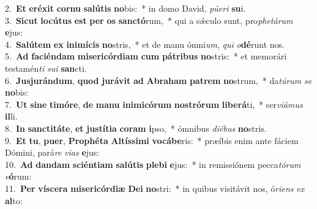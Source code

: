{2.~}\textbf{Et} \textbf{e}\textbf{ré}\textbf{xit} \textbf{cor}\textbf{nu} \textbf{sa}\textbf{lú}\textbf{tis} \textbf{no}bis:~* in domo David, \textit{pú}\textit{e}\textit{ri} \textbf{su}i.\\
{3.~}\textbf{Si}\textbf{cut} \textbf{lo}\textbf{cú}\textbf{tus} \textbf{est} \textbf{per} \textbf{os} \textbf{san}\textbf{ctó}rum,~* qui a sǽculo sunt, pro\textit{phe}\textit{tá}\textit{rum} \textbf{e}jus:\\
{4.~}\textbf{Sa}\textbf{lú}\textbf{tem} \textbf{ex} \textbf{i}\textbf{ni}\textbf{mí}\textbf{cis} \textbf{no}stris,~* et de manu ómni\textit{um}, \textit{qui} \textit{o}\textbf{dé}runt nos.\\
{5.~}\textbf{Ad} \textbf{fa}\textbf{ci}\textbf{én}\textbf{dam} \textbf{mi}\textbf{se}\textbf{ri}\textbf{cór}\textbf{di}\textbf{am} \textbf{cum} \textbf{pá}\textbf{tri}\textbf{bus} \textbf{no}stris:~* et memorári testamén\textit{ti} \textit{su}\textit{i} \textbf{san}cti.\\
{6.~}\textbf{Jus}\textbf{ju}\textbf{rán}\textbf{dum}, \textbf{quod} \textbf{ju}\textbf{rá}\textbf{vit} \textbf{ad} \textbf{A}\textbf{bra}\textbf{ham} \textbf{pa}\textbf{trem} \textbf{no}strum,~* da\textit{tú}\textit{rum} \textit{se} \textbf{no}bis:\\
{7.~}\textbf{Ut} \textbf{si}\textbf{ne} \textbf{ti}\textbf{mó}\textbf{re}, \textbf{de} \textbf{ma}\textbf{nu} \textbf{i}\textbf{ni}\textbf{mi}\textbf{có}\textbf{rum} \textbf{no}\textbf{stró}\textbf{rum} \textbf{li}\textbf{be}\textbf{rá}ti,~* ser\textit{vi}\textit{á}\textit{mus} \textbf{il}li.\\
{8.~}\textbf{In} \textbf{san}\textbf{cti}\textbf{tá}\textbf{te}, \textbf{et} \textbf{ju}\textbf{stí}\textbf{ti}\textbf{a} \textbf{co}\textbf{ram} \textbf{i}pso,~* ómnibus \textit{di}\textit{é}\textit{bus} \textbf{no}stris.\\
{9.~}\textbf{Et} \textbf{tu}, \textbf{pu}\textbf{er}, \textbf{Pro}\textbf{phé}\textbf{ta} \textbf{Al}\textbf{tís}\textbf{si}\textbf{mi} \textbf{vo}\textbf{cá}\textbf{be}ris:~* præíbis enim ante fáciem Dómini, pará\textit{re} \textit{vi}\textit{as} \textbf{e}jus:\\
{10.~}\textbf{Ad} \textbf{dan}\textbf{dam} \textbf{sci}\textbf{én}\textbf{ti}\textbf{am} \textbf{sa}\textbf{lú}\textbf{tis} \textbf{ple}\textbf{bi} \textbf{e}jus:~* in remissiónem pecca\textit{tó}\textit{rum} \textit{e}\textbf{ó}rum:\\
{11.~}\textbf{Per} \textbf{ví}\textbf{sce}\textbf{ra} \textbf{mi}\textbf{se}\textbf{ri}\textbf{cór}\textbf{di}\textbf{æ} \textbf{De}\textbf{i} \textbf{no}stri:~* in quibus visitávit nos, ó\textit{ri}\textit{ens} \textit{ex} \textbf{al}to:\\

